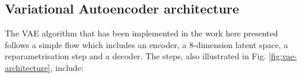\subsection{Variational Autoencoder architecture}
\label{sec:model-architeture}

The \ac{VAE} algorithm that has been implemented in the work here presented follows a simple flow which includes an encoder, a 8-dimension latent space, a reparametrisation step and a decoder. The steps, also illustrated in Fig. \ref{fig:vae-architecture}, include: 
